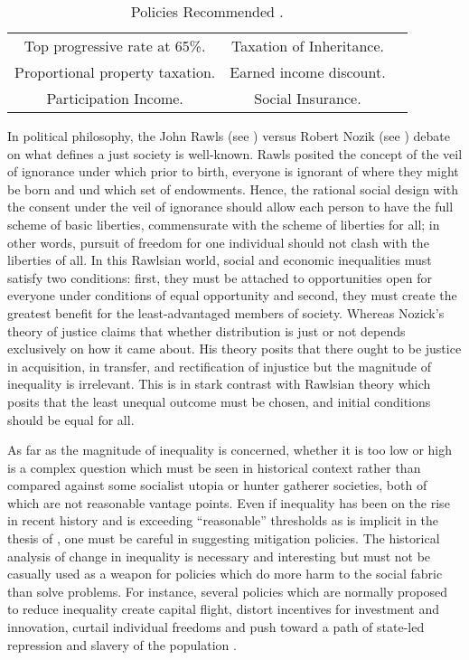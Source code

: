 \documentclass[12pt]{article}
\newcommand{\1}{\mathbbm 1}
\begin{document}
	
	\begin{table} [h!]
	\begin{center}
		\begin{tabular}{ |c | c | c | }
			\hline
			Top progressive rate at 65\%. & Taxation of Inheritance. \\
			Proportional property  taxation.  & Earned income discount.\\
			Participation Income. & Social Insurance.\\
			\hline
		\end{tabular}
	\end{center}
\caption{Policies Recommended \cite{atkinson2015inequality}.}
\label {table:1}
\end{table}


In political philosophy, the John Rawls (see \cite{rawlstheory1971}) versus Robert Nozik (see \cite{nozick1974anarchy}) debate on what defines a just society is well-known. Rawls posited the concept of the veil of ignorance under which prior to birth, everyone is ignorant of where they might be born and und which set of endowments. Hence, the rational social design with the consent under the veil of ignorance should allow each person to have the full scheme of basic liberties, commensurate with the scheme of liberties for all; in other words, pursuit of freedom for one individual should not clash with the liberties of all. In this Rawlsian world, social and economic inequalities must satisfy two conditions: first, they must be attached to opportunities open for everyone under conditions of equal opportunity and second, they must create the greatest benefit for the least-advantaged members of society. Whereas Nozick's theory of justice claims that whether distribution is just or not depends exclusively on how it came about. His theory posits that there ought to be justice in acquisition, in transfer, and rectification of injustice but the magnitude of inequality is irrelevant. This is in stark contrast with Rawlsian theory which posits that the least unequal outcome must be chosen, and initial conditions should be equal for all.


As far as the magnitude of inequality is concerned, whether it is too low or high is a complex question which must be seen in historical context rather than compared against some socialist utopia or hunter gatherer societies, both of which are not reasonable vantage points. Even if inequality has been on the rise in recent history and is exceeding ``reasonable'' thresholds as is implicit in the thesis of \cite{piketty2017capital}, one must be careful in suggesting mitigation policies. The historical analysis of change in inequality is necessary and interesting but must not be casually used as a weapon for policies which do more harm to the social fabric than solve problems. For instance, several policies which are normally proposed to reduce inequality create capital flight, distort incentives for investment and innovation, curtail individual freedoms and push toward a path of state-led repression and slavery of the population \cite{friedrich1945road}.
\end{document}
